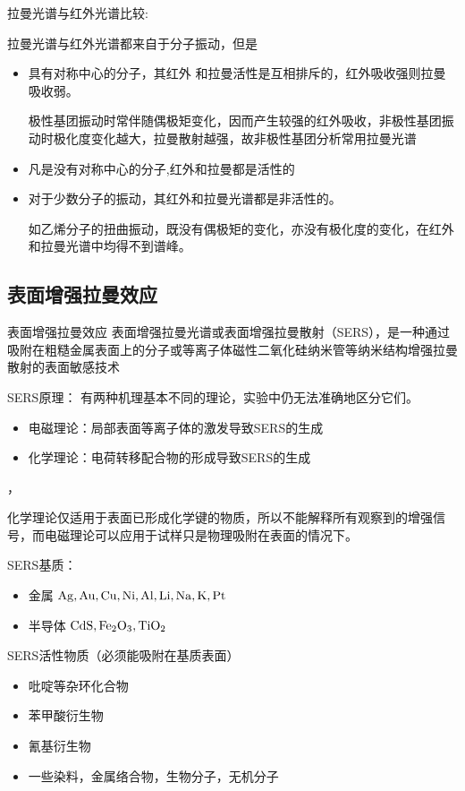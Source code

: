 \begin{note}
    拉曼光谱与红外光谱比较:

    拉曼光谱与红外光谱都来自于分子振动，但是
    \begin{itemize}
        \item 具有对称中心的分子，其红外	和拉曼活性是互相排斥的，红外吸收强则拉曼吸收弱。
        
        \begin{example}
            极性基团振动时常伴随偶极矩变化，因而产生较强的红外吸收，非极性基团振动时极化度变化越大，拉曼散射越强，故非极性基团分析常用拉曼光谱
        \end{example}
        \item 凡是没有对称中心的分子,红外和拉曼都是活性的
        \item 对于少数分子的振动，其红外和拉曼光谱都是非活性的。
        \begin{example}
            如乙烯分子的扭曲振动，既没有偶极矩的变化，亦没有极化度的变化，在红外和拉曼光谱中均得不到谱峰。
        \end{example}
    \end{itemize}
\end{note}
\subsection{表面增强拉曼效应}
\begin{definition*}{表面增强拉曼效应}
    表面增强拉曼光谱或表面增强拉曼散射（SERS），是一种通过吸附在粗糙金属表面上的分子或等离子体磁性二氧化硅纳米管等纳米结构增强拉曼散射的表面敏感技术
\end{definition*}

SERS原理：
有两种机理基本不同的理论，实验中仍无法准确地区分它们。
\begin{itemize}
    \item 电磁理论：局部表面等离子体的激发导致SERS的生成
    \item 化学理论：电荷转移配合物的形成导致SERS的生成
\end{itemize}，
\begin{note}
    化学理论仅适用于表面已形成化学键的物质，所以不能解释所有观察到的增强信号，而电磁理论可以应用于试样只是物理吸附在表面的情况下。
\end{note}

SERS基质： 
\begin{itemize}
    \item     金属    $\ce{Ag},\ce{ Au}, \ce{Cu},\ce{Ni},\ce{ Al},\ce{ Li},\ce{ Na,} \ce{K}, \ce{Pt}
    $
    \item     半导体  $\ce{CdS}, \ce{Fe_{2}O_{3}}, \ce{TiO_{2}}$
\end{itemize}


SERS活性物质（必须能吸附在基质表面）
\begin{itemize}
    \item 	吡啶等杂环化合物
    \item   苯甲酸衍生物
    \item   氰基衍生物
    \item   一些染料，金属络合物，生物分子，无机分子
\end{itemize}
